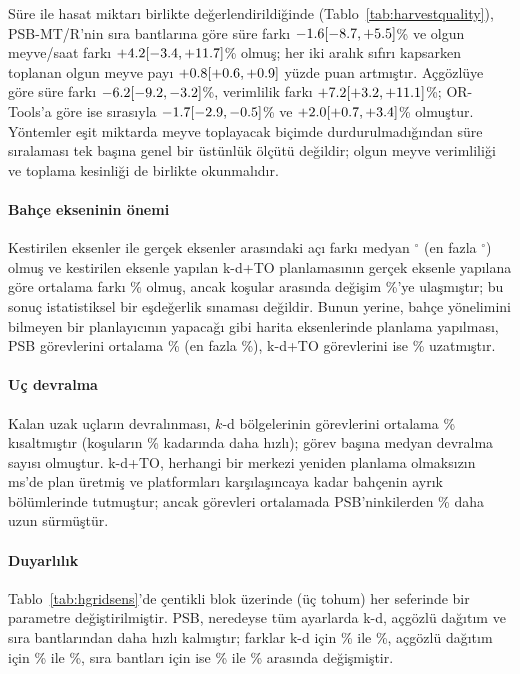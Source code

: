 Süre ile hasat miktarı birlikte değerlendirildiğinde (Tablo~\ref{tab:harvestquality}),
PSB-MT/R'nin sıra bantlarına göre süre farkı $-1.6 [-8.7,+5.5]$\% ve olgun
meyve/saat farkı $+4.2 [-3.4,+11.7]$\% olmuş; her iki aralık sıfırı kapsarken
toplanan olgun meyve payı $+0.8 [+0.6,+0.9]$ yüzde puan artmıştır. Açgözlüye göre
süre farkı $-6.2 [-9.2,-3.2]$\%, verimlilik farkı $+7.2 [+3.2,+11.1]$\%;
OR-Tools'a göre ise sırasıyla $-1.7 [-2.9,-0.5]$\% ve
$+2.0 [+0.7,+3.4]$\% olmuştur. Yöntemler eşit miktarda meyve toplayacak
biçimde durdurulmadığından süre sıralaması tek başına genel bir üstünlük ölçütü
değildir; olgun meyve verimliliği ve toplama kesinliği de birlikte okunmalıdır.

\paragraph{Bahçe ekseninin önemi} Kestirilen eksenler ile gerçek eksenler arasındaki açı farkı
medyan \HgThetaErrMed$^\circ$ (en fazla \HgThetaErrMax$^\circ$) olmuş ve kestirilen
eksenle yapılan k-d+TO planlamasının gerçek eksenle yapılana göre ortalama farkı
\HgFrameOracle\% olmuş, ancak koşular arasında değişim \HgFrameOracleMax\%'ye ulaşmıştır;
bu sonuç istatistiksel bir eşdeğerlik sınaması değildir. Bunun yerine, bahçe yönelimini bilmeyen bir
planlayıcının yapacağı gibi harita eksenlerinde planlama yapılması, PSB görevlerini ortalama
\HgFramePsbAxisZero\% (en fazla \HgFramePsbAxisZeroMax\%), k-d+TO görevlerini ise
\HgFrameAxisZero\% uzatmıştır.

\paragraph{Uç devralma} Kalan uzak uçların devralınması, $k$-d bölgelerinin
görevlerini ortalama \HgTakeoverGain\% kısaltmıştır (koşuların
\HgTakeoverWin\% kadarında daha hızlı); görev başına medyan devralma sayısı
\HgStealsMed{} olmuştur. k-d+TO, herhangi bir merkezi yeniden planlama olmaksızın \HgKdPlanMs\,ms'de
plan üretmiş ve platformları karşılaşıncaya kadar bahçenin ayrık bölümlerinde tutmuştur; ancak
görevleri ortalamada PSB'ninkilerden \HgKdstealRel\% daha uzun sürmüştür.

\paragraph{Duyarlılık} Tablo~\ref{tab:hgridsens}'de çentikli blok üzerinde (üç tohum) her seferinde
bir parametre değiştirilmiştir. PSB, neredeyse tüm ayarlarda k-d, açgözlü dağıtım ve sıra
bantlarından daha hızlı kalmıştır; farklar k-d için
\HgsMinKd\% ile \HgsMaxKd\%, açgözlü dağıtım için \HgsMinGreedy\% ile \HgsMaxGreedy\%,
sıra bantları için ise \HgsMinRowblock\% ile \HgsMaxRowblock\% arasında değişmiştir.

